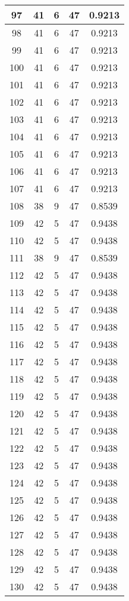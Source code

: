 \documentclass[letterpaper, 12pt]{article}
\begin{document}
\begin{longtable}{|c|c|c|c|c|}
\hline
97 & 41 & 6 & 47 & 0.9213 \\
\hline
98 & 41 & 6 & 47 & 0.9213 \\
\hline
99 & 41 & 6 & 47 & 0.9213 \\
\hline
100 & 41 & 6 & 47 & 0.9213 \\
\hline
101 & 41 & 6 & 47 & 0.9213 \\
\hline
102 & 41 & 6 & 47 & 0.9213 \\
\hline
103 & 41 & 6 & 47 & 0.9213 \\
\hline
104 & 41 & 6 & 47 & 0.9213 \\
\hline
105 & 41 & 6 & 47 & 0.9213 \\
\hline
106 & 41 & 6 & 47 & 0.9213 \\
\hline
107 & 41 & 6 & 47 & 0.9213 \\
\hline
108 & 38 & 9 & 47 & 0.8539 \\
\hline
109 & 42 & 5 & 47 & 0.9438 \\
\hline
110 & 42 & 5 & 47 & 0.9438 \\
\hline
111 & 38 & 9 & 47 & 0.8539 \\
\hline
112 & 42 & 5 & 47 & 0.9438 \\
\hline
113 & 42 & 5 & 47 & 0.9438 \\
\hline
114 & 42 & 5 & 47 & 0.9438 \\
\hline
115 & 42 & 5 & 47 & 0.9438 \\
\hline
116 & 42 & 5 & 47 & 0.9438 \\
\hline
117 & 42 & 5 & 47 & 0.9438 \\
\hline
118 & 42 & 5 & 47 & 0.9438 \\
\hline
119 & 42 & 5 & 47 & 0.9438 \\
\hline
120 & 42 & 5 & 47 & 0.9438 \\
\hline
121 & 42 & 5 & 47 & 0.9438 \\
\hline
122 & 42 & 5 & 47 & 0.9438 \\
\hline
123 & 42 & 5 & 47 & 0.9438 \\
\hline
124 & 42 & 5 & 47 & 0.9438 \\
\hline
125 & 42 & 5 & 47 & 0.9438 \\
\hline
126 & 42 & 5 & 47 & 0.9438 \\
\hline
127 & 42 & 5 & 47 & 0.9438 \\
\hline
128 & 42 & 5 & 47 & 0.9438 \\
\hline
129 & 42 & 5 & 47 & 0.9438 \\
\hline
130 & 42 & 5 & 47 & 0.9438 \\

\end{longtable}
\end{document}

